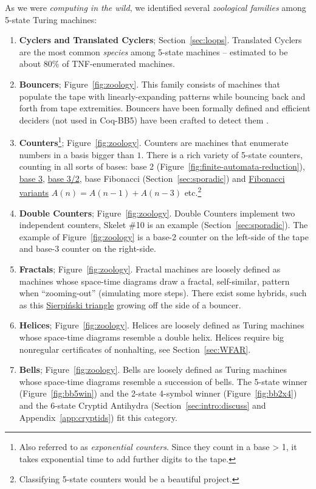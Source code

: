 \documentclass[sigconf,screen]{acmart}
\theoremstyle{definition} %
\numberwithin{equation}{section}
\theoremstyle{definition} %
\newcommand{\CoqBB}{Coq-BB5\xspace}
\begin{document}
As we were \textit{computing in the wild}, we identified several \textit{zoological families} among 5-state Turing machines:

\begin{enumerate}
    \item \textbf{Cyclers and Translated Cyclers}; Section~\ref{sec:loops}. Translated Cyclers are the most common \textit{species} among 5-state machines -- estimated to be about 80\% of TNF-enumerated machines.
    \item \textbf{Bouncers}; Figure~\ref{fig:zoology}. This family consists of machines that populate the tape with linearly-expanding patterns while bouncing back and forth from tape extremities. Bouncers have been formally defined and efficient deciders (not used in \CoqBB) have been crafted to detect them \cite{bbchallenge_part1}.
    \item \textbf{Counters}\footnote{Also referred to as \textit{exponential counters}. Since they count in a base > 1, it takes exponential time to add further digits to the tape.}; Figure~\ref{fig:zoology}. Counters are machines that enumerate numbers in a basis bigger than $1$. There is a rich variety of 5-state counters, counting in all sorts of bases: base 2 (Figure~\ref{fig:finite-automata-reduction}), \href{https://bbchallenge.org/1RB1RB_1RC0LD_1LD1RA_---1LE_0RA0LE }{base 3}, \href{https://bbchallenge.org/1LB1RC_0LE0RA_1LD1RA_0RA1LB_0RD0LB}{base 3/2}, base Fibonacci (Section~\ref{sec:sporadic}) and \href{https://bbchallenge.org/1RB1RA_0LC1LC_0RD1LD_0RA0LB}{Fibonacci variants} $A(n) = A(n-1) + A(n-3)$ etc.\footnote{Classifying 5-state counters would be a beautiful project.}
    \item \textbf{Double Counters}; Figure~\ref{fig:zoology}. Double Counters implement two independent counters, Skelet \#10 is an example (Section~\ref{sec:sporadic}). The example of Figure~\ref{fig:zoology} is a base-2 counter on the left-side of the tape and base-3 counter on the right-side.
    \item \textbf{Fractals}; Figure~\ref{fig:zoology}. Fractal machines are loosely defined as machines whose space-time diagrams draw a fractal, self-similar, pattern when ``zooming-out'' (\ie simulating more steps). There exist some hybrids, such as this \href{https://bbchallenge.org/1RB1RC_1RC1RB_1LD0RA_---1LE_0LD0LA&s=20000}{Sierpiński triangle} growing off the side of a bouncer.
    \item \textbf{Helices}; Figure~\ref{fig:zoology}. Helices are loosely defined as Turing machines whose space-time diagrams resemble a double helix. Helices require big nonregular certificates of nonhalting, see Section~\ref{sec:WFAR}.
    \item \textbf{Bells}; Figure~\ref{fig:zoology}. Bells are loosely defined as Turing machines whose space-time diagrams resemble a succession of bells. The 5-state winner (Figure~\ref{fig:bb5win}) and the 2-state 4-symbol winner (Figure~\ref{fig:bb2x4}) and the 6-state Cryptid Antihydra (Section~\ref{sec:intro:discuss} and Appendix~\ref{app:cryptids}) fit this category.
\end{enumerate}
\end{document}
